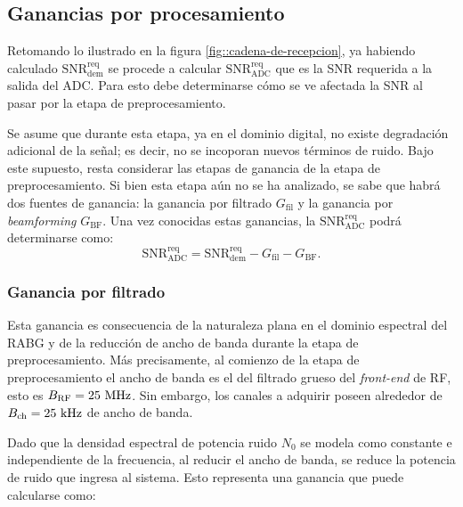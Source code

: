 \documentclass[../../main.tex]{subfiles}
\begin{document}

\subsection{Ganancias por procesamiento} \label{sec::ganancias-por-preproc}
Retomando lo ilustrado en la figura \ref{fig::cadena-de-recepcion}, ya habiendo calculado $\textrm{SNR}^\textrm{req}_\textrm{dem}$ se procede a calcular $\textrm{SNR}^\textrm{req}_\textrm{ADC}$ que es la SNR requerida a la salida del ADC. Para esto debe determinarse cómo se ve afectada la SNR al pasar por la etapa de preprocesamiento.

Se asume que durante esta etapa, ya en el dominio digital, no existe degradación adicional de la señal; es decir, no se incoporan nuevos términos de ruido. 
Bajo este supuesto, resta considerar las etapas de ganancia de la etapa de preprocesamiento. 
Si bien esta etapa aún no se ha analizado, se sabe que habrá dos fuentes de ganancia: la ganancia por filtrado $G_\textrm{fil}$ y la ganancia por \textit{beamforming} $G_\textrm{BF}$. Una vez conocidas estas ganancias, la $\textrm{SNR}^\textrm{req}_\textrm{ADC}$ podrá determinarse como:
\begin{equation}
    \textrm{SNR}^\textrm{req}_\textrm{ADC} = \textrm{SNR}^\textrm{req}_\textrm{dem} - G_\textrm{fil} - G_\textrm{BF}.
    \label{eq::SRN2SNR}
\end{equation}

\subsubsection{Ganancia por filtrado}
Esta ganancia es consecuencia de la naturaleza plana en el dominio espectral del RABG y de la reducción de ancho de banda durante la etapa de preprocesamiento. Más precisamente, al comienzo de la etapa de preprocesamiento el ancho de banda es el del filtrado grueso del \textit{front-end} de RF, esto es $B_\textrm{RF} = 25~\textrm{MHz}$. Sin embargo, los canales a adquirir poseen alrededor de $B_\textrm{ch} = 25~\textrm{kHz}$ de ancho de banda. 

Dado que la densidad espectral de potencia ruido $N_0$ se modela como constante e independiente de la frecuencia, al reducir el ancho de banda, se reduce la potencia de ruido que ingresa al sistema. Esto representa una ganancia que puede calcularse como:
\end{document}
